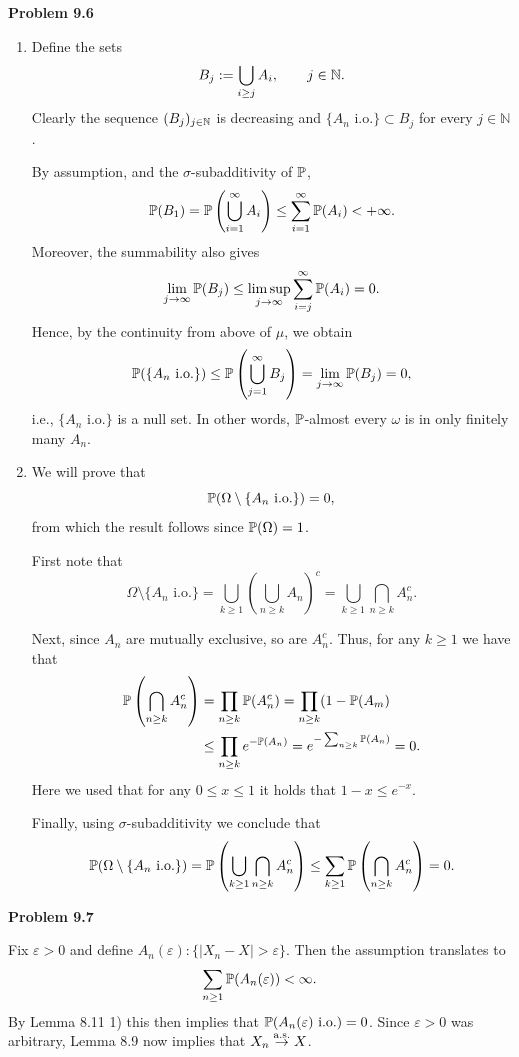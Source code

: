 \textbf{Problem 9.6}
\begin{enumerate}[label={(\alph*)}]
\item Define the sets
\[
	B_j := \bigcup_{i \ge j} A_i,\qquad j\in\mathbb N.
\]
Clearly the sequence $(B_j)_{j\in\mathbb N}$ is decreasing and $\{A_n \text{ i.o.}\}\subset B_j$ for every $j \in \mathbb{N}$. 

By assumption, and the $\sigma$-subadditivity of $\mathbb P$,
\[
\mathbb P(B_1) = \mathbb P\left(\bigcup_{i=1}^\infty A_i \right) \leq \sum_{i=1}^\infty \mathbb P(A_i) < +\infty.
\]
Moreover, the summability also gives
\[
	\lim_{j\to\infty}\mathbb P(B_j) \leq \limsup_{j\to\infty}\sum_{i=j}^\infty \mathbb P(A_i) = 0.
\]
Hence, by the continuity from above of $\mu$, we obtain
\[
	\mathbb P(\{A_n \text{ i.o.}\}) \le \mathbb P\left(\bigcup_{j=1}^\infty B_j\right) = \lim_{j\to \infty} \mathbb P(B_j) = 0,
\]
i.e., $\{A_n \text{ i.o.}\}$ is a null set. In other words, $\mathbb P$-almost every $\omega$ is in only finitely many $A_n$.
\item We will prove that 
\[
	\mathbb P(\Omega \setminus \{A_n \text{ i.o.}\}) = 0,
\]
from which the result follows since $\mathbb P(\Omega) = 1$.

First note that
\[
	\Omega \setminus \{A_n \text{ i.o.}\} = \bigcup_{k \ge 1} \left(\bigcup_{n \ge k} A_n\right)^c
	= \bigcup_{k \ge 1} \bigcap_{n \ge k} A_n^c.
\]

Next, since $A_n$ are mutually exclusive, so are $A_n^c$. Thus, for any $k \ge 1$ we have that
\begin{align*}
	\mathbb P\left(\bigcap_{n \ge k} A_n^c\right) &= \prod_{n \ge k} \mathbb P(A_n^c) = \prod_{n \ge k} (1-\mathbb P(A_m)\\
	&\le \prod_{n \ge k} e^{-\mathbb P(A_n)} = e^{-\sum_{n \ge k} \mathbb P(A_n)} = 0.
\end{align*}
Here we used that for any $0 \le x \le 1$ it holds that $1-x \le e^{-x}$.

Finally, using $\sigma$-subadditivity we conclude that
\[
	\mathbb P(\Omega \setminus \{A_n \text{ i.o.}\}) = \mathbb P\left(\bigcup_{k \ge 1} \bigcap_{n \ge k} A_n^c\right)
	\le \sum_{k \ge 1} \mathbb P\left(\bigcap_{n \ge k} A_n^c\right) = 0.
\]
\end{enumerate}

\bigskip

\textbf{Problem 9.7}

Fix $\varepsilon > 0$ and define $A_n(\varepsilon) :\{|X_n - X| > \varepsilon\}$. Then the assumption translates to
\[
	\sum_{n \ge 1} \mathbb P(A_n(\varepsilon)) < \infty.
\]
By Lemma 8.11 1) this then implies that $\mathbb P(A_n(\varepsilon) \text{ i.o.}) = 0$. Since $\varepsilon > 0$ was arbitrary, Lemma 8.9 now implies that $X_n \stackrel{\mathrm{a.s.}}{\rightarrow} X$.
